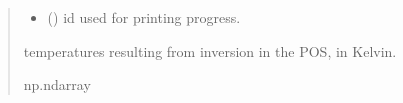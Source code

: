 \documentclass[letterpaper,10pt,english]{sphinxmanual}
\begin{document}
\begin{fulllineitems}
\begin{quote}
\begin{description}
\begin{itemize}
\item {} 
\sphinxAtStartPar
{} () \textendash{} id used for printing progress.

\end{itemize}

\sphinxAtStartPar
temperatures resulting from inversion in the POS, in Kelvin.

\sphinxAtStartPar
np.ndarray

\end{description}\end{quote}

\end{fulllineitems}

\end{document}
